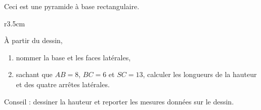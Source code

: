 
\begin{exercice}\label{exo2smath-0181}

    Ceci est une pyramide à base rectangulaire.

\begin{wrapfigure}{r}{3.5cm}
   \vspace{-0.5cm}        %
   \centering
   
\end{wrapfigure}
À partir du dessin,
\begin{enumerate}
    \item
        nommer la base et les faces latérales,
    \item
        sachant que \( AB=8\), \( BC=6\) et \( SC=13\), calculer les longueurs de la hauteur et des quatre arrêtes latérales.
\end{enumerate}

Conseil : dessiner la hauteur et reporter les mesures données sur le dessin.

\end{exercice}
